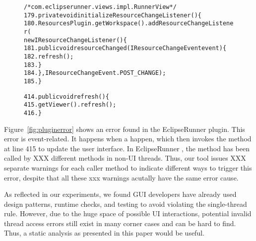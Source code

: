 \begin{figure}[t]
\begin{CodeOut}
\begin{alltt} 
/* com.eclipserunner.views.impl.RunnerView */
179.private void initializeResourceChangeListener() \{
180.  ResourcesPlugin.getWorkspace().addResourceChangeListener(
        new IResourceChangeListener() \{
181.      public void resourceChanged(IResourceChangeEvent event) \{
182.        refresh();
183.      \}
184.  \}, IResourceChangeEvent.POST\_CHANGE);
185.\}

414.public void refresh() \{
415.  getViewer().refresh();
416.\}
\end{alltt}
\end{CodeOut}
\vspace*{-2.0ex}  %
\end{figure}

Figure~\ref{fig:pluginerror} shows an error found in the EclipseRunner
plugin. This error is event-related. It happens when a 
 happen, which then invokes the 
method at line 415 to update the user interface. In EclipseRunner
, the  method has been
called by XXX different methods in non-UI threads. Thus, our
tool issues XXX separate warnings for each caller method to indicate
different ways to trigger this error, despite that all these xxx warnings
acutally have the same error cause.

As reflected in our experiments, we found GUI developers have already
used design patterns, runtime checks, and testing to avoid violating
the single-thread rule. However, due to the huge space of
possible UI interactions, potential
invalid thread access errors still exist in many corner cases and
can be hard to find. Thus, a static analysis as presented in this paper
would be useful.

\vspace{1mm}

